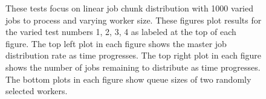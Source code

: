 \documentclass{article}
\begin{document}
\begin{figure}[p]
  
  \caption{These tests focus on linear job chunk distribution with 1000 varied jobs to process and varying worker size. These figures plot results for the varied test numbers 1, 2, 3, 4 as labeled at the top of each figure. The top left plot in each figure shows the master job distribution rate as time progresses. The top right plot in each figure shows the number of jobs remaining to distribute as time progresses. The bottom plots in each figure show queue sizes of two randomly selected workers.}
  \label{testsVariedLinear} 
  
\end{figure}
\end{document}
